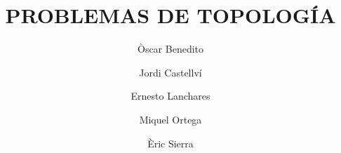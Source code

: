 \documentclass[spanish]{../notes}
\title{PROBLEMAS DE TOPOLOGÍA}
\author{Òscar Benedito\and Jordi Castellví\and Ernesto Lanchares\and Miquel Ortega\and Èric Sierra}
\begin{document}
\makecover



\end{document}
